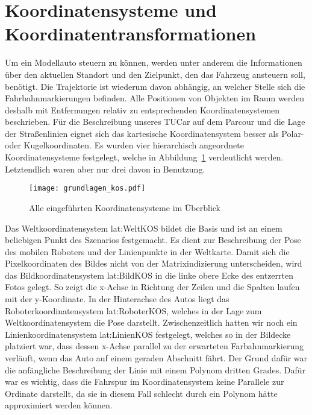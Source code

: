 \section{Koordinatensysteme und Koordinatentransformationen}

Um ein Modellauto steuern zu können, werden unter anderem die Informationen über den aktuellen Standort und den Zielpunkt, den das Fahrzeug ansteuern soll, benötigt. Die Trajektorie ist wiederum davon abhängig, an welcher Stelle sich die Fahrbahnmarkierungen befinden. Alle Positionen von Objekten im Raum werden deshalb mit Entfernungen relativ zu entsprechenden Koordinatensystemen beschrieben. Für die Beschreibung unseres TUCar auf dem Parcour und die Lage der Straßenlinien eignet sich das kartesische Koordinatensystem besser als Polar- oder Kugelkoordinaten. Es wurden vier hierarchisch angeordnete Koordinatensysteme festgelegt, welche in Abbildung~\ref{fig:grundlagen_kos} verdeutlicht werden. Letztendlich waren aber nur drei davon in Benutzung. 

\begin{figure}[H] %
  \centering
  \texttt{[image: grundlagen\_kos.pdf]}
  \caption{Alle eingeführten Koordinatensysteme im Überblick}
  \label{fig:grundlagen_kos}
\end{figure}

Das Weltkoordinatensystem \gls{lat:WeltKOS} bildet die Basis und ist an einem beliebigen Punkt des Szenarios festgemacht. Es dient zur Beschreibung der Pose des mobilen Roboters und der Linienpunkte in der Weltkarte. Damit sich die Pixelkoordinaten des Bildes nicht von der Matrixindizierung unterscheiden, wird das Bildkoordinatensystem \gls{lat:BildKOS} in die linke obere Ecke des entzerrten Fotos gelegt. So zeigt die x-Achse in Richtung der Zeilen und die Spalten laufen mit der y-Koordinate. In der Hinterachse des Autos liegt das Roboterkoordinatensystem \gls{lat:RoboterKOS}, welches in der Lage zum Weltkoordinatensystem die Pose darstellt. Zwischenzeitlich hatten wir noch ein Linienkoordinatensystem \gls{lat:LinienKOS} festgelegt, welches so in der Bildecke platziert war, dass dessen x-Achse parallel zu der erwarteten Farbahnmarkierung verläuft, wenn das Auto auf einem geraden Abschnitt fährt. Der Grund dafür war die anfängliche Beschreibung der Linie mit einem Polynom dritten Grades. Dafür war es wichtig, dass die Fahrspur im Koordinatensystem keine Parallele zur Ordinate darstellt, da sie in diesem Fall schlecht durch ein Polynom hätte approximiert werden können. 

